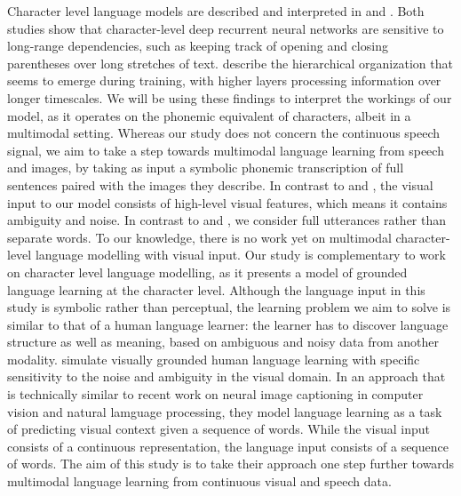 Character level language models are described and interpreted in  and . Both studies show that character-level deep recurrent neural networks are sensitive to long-range dependencies, such as keeping track of opening and closing parentheses over long stretches of text.  describe the hierarchical organization that seems to emerge during training, with higher layers processing information over longer timescales. We will be using these findings to interpret the workings of our model, as it operates on the phonemic equivalent of characters, albeit in a multimodal setting. 
Whereas our study does not concern the continuous speech signal, we aim to take a step towards multimodal language learning from speech and images, by taking as input a symbolic phonemic transcription of full sentences paired with the images they describe. In contrast to  and , the visual input to our model consists of high-level visual features, which means it contains ambiguity and noise. In contrast to  and  , we consider full utterances rather than separate words. To our knowledge, there is no work yet on multimodal character-level language modelling with visual input. Our study is complementary to work on character level language modelling, as it presents a model of grounded language learning at the character level. Although the language input in this study is symbolic rather than perceptual, the learning problem we aim to solve is similar to that of a human language learner: the learner has to discover language structure as well as meaning, based on ambiguous and noisy data from another modality.  
 simulate visually grounded human language learning with specific sensitivity to the noise and ambiguity in the visual domain. In an approach that is technically similar to recent work on neural image captioning in computer vision and natural lamguage processing, they model language learning as a task of predicting visual context given a sequence of words. While the visual input consists of a continuous representation, the language input consists of a sequence of words. The aim of this study is to take their approach one step further towards multimodal language learning from continuous visual and speech data.